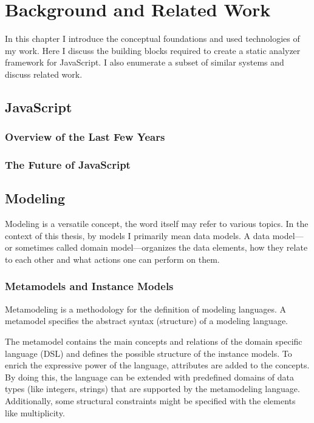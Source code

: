 \chapter{Background and Related Work}
\label{chap:background-and-related-work}

In this chapter I introduce the conceptual foundations and used technologies of my work. Here I discuss the building blocks required to create a static analyzer framework for JavaScript. I also enumerate a subset of similar systems and discuss related work.

\section{JavaScript}
\subsection{Overview of the Last Few Years}
\subsection{The Future of JavaScript}

\section{Modeling}
Modeling is a versatile concept, the word itself may refer to various topics. In the context of this thesis, by models I primarily mean data models. A data model---or sometimes called domain model---organizes the data elements, how they relate to each other and what actions one can perform on them.

\subsection{Metamodels and Instance Models}
Metamodeling is a methodology for the definition of modeling languages. A metamodel specifies the abstract syntax (structure) of a modeling language.~\cite{scm}

The metamodel contains the main concepts and relations of the domain specific language (DSL) and defines the possible structure of the instance models. To enrich the expressive power of the language, attributes are added to the concepts. By doing this, the language can be extended with predefined domains of data types (like integers, strings) that are supported by the metamodeling language. Additionally, some structural constraints might be specified with the elements like multiplicity.

